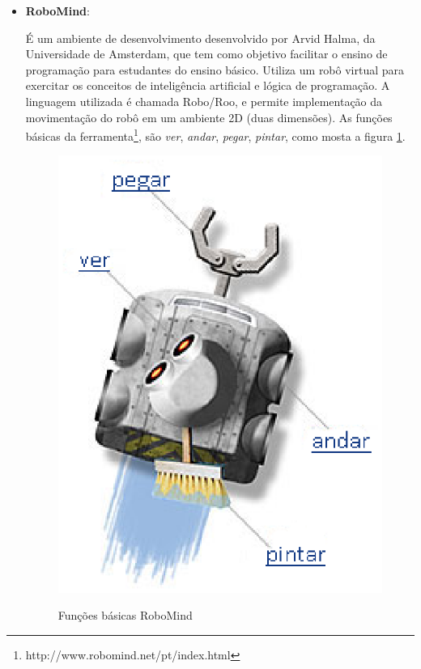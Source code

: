 \begin{itemize}
	\item \textbf{RoboMind}: 

		É um ambiente de desenvolvimento desenvolvido por Arvid Halma, da Universidade de Amsterdam, que tem como objetivo facilitar o ensino de programação para estudantes do ensino básico. Utiliza um robô virtual para exercitar os conceitos de inteligência artificial e lógica de programação. A linguagem utilizada é chamada Robo/Roo, e permite implementação da movimentação do robô em um ambiente 2D (duas dimensões). As funções básicas da ferramenta\footnote{http://www.robomind.net/pt/index.html}, são \textit{ver}, \textit{andar}, \textit{pegar}, \textit{pintar}, como mosta a figura \ref{img:funcoesBasicasRoboMind}.

		\begin{figure}[H]
			\centering
			\caption{Funções básicas RoboMind}
			\includegraphics[scale=0.8]{figuras/funcoesBasicasRoboMind.eps}
			\label{img:funcoesBasicasRoboMind}
		\end{figure}


\end{itemize}

